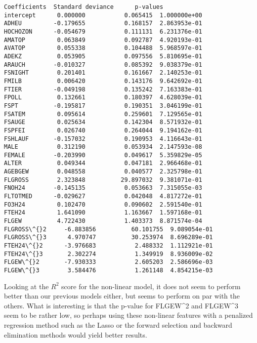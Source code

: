 \documentclass[11pt]{article}
\makeatletter
\newcommand{\boxspacing}{\kern\kvtcb@left@rule\kern\kvtcb@boxsep}
\newcommand{\prompt}[4]{
        \ttfamily\llap{{\color{#2}[#3]:\hspace{3pt}#4}}\vspace{-\baselineskip}
    }
\makeatother
\begin{document}
            \begin{tcolorbox}[breakable, size=fbox, boxrule=.5pt, pad at break*=1mm, opacityfill=0]
\prompt{Out}{outcolor}{31}{\boxspacing}
\begin{Verbatim}[commandchars=\\\{\}]
           Coefficients  Standard deviance      p-values
intercept      0.000000           0.065415  1.000000e+00
ADHEU         -0.179655           0.168157  2.863953e-01
HOCHOZON      -0.054679           0.111131  6.231376e-01
AMATOP         0.063849           0.092787  4.920193e-01
AVATOP         0.055338           0.104488  5.968597e-01
ADEKZ          0.053905           0.097556  5.810695e-01
ARAUCH        -0.010327           0.085392  9.038379e-01
FSNIGHT        0.201401           0.161667  2.140253e-01
FMILB          0.006420           0.143176  9.642692e-01
FTIER         -0.049198           0.135242  7.163383e-01
FPOLL          0.132661           0.180397  4.628039e-01
FSPT          -0.195817           0.190351  3.046199e-01
FSATEM         0.095614           0.259601  7.129565e-01
FSAUGE         0.025634           0.142304  8.571932e-01
FSPFEI         0.026740           0.264044  9.194162e-01
FSHLAUF       -0.157032           0.190953  4.116643e-01
MALE           0.312190           0.053934  2.147593e-08
FEMALE        -0.203990           0.049617  5.359829e-05
ALTER          0.049344           0.047181  2.966468e-01
AGEBGEW        0.048558           0.040577  2.325798e-01
FLGROSS        2.323848          29.897032  9.381071e-01
FNOH24        -0.145135           0.053663  7.315055e-03
FLTOTMED      -0.029627           0.042048  4.817272e-01
FO3H24         0.102470           0.090602  2.591540e-01
FTEH24         1.641090           1.163667  1.597168e-01
FLGEW          4.722430           1.403373  8.871574e-04
FLGROSS\^{}2     -6.883856          60.101755  9.089054e-01
FLGROSS\^{}3      4.970747          30.253974  8.696289e-01
FTEH24\^{}2      -3.976683           2.488332  1.112921e-01
FTEH24\^{}3       2.302274           1.349919  8.936009e-02
FLGEW\^{}2       -7.930333           2.605203  2.586696e-03
FLGEW\^{}3        3.584476           1.261148  4.854215e-03
\end{Verbatim}
\end{tcolorbox}
        
    Looking at the \(R^2\) score for the non-linear model, it does not seem
to perform better than our previous models either, but seems to perform
on par with the others. What is interesting is that the p-value for
FLGEW\^{}2 and FLGEW\^{}3 seem to be rather low, so perhaps using these
non-linear features with a penalized regression method such as the Lasso
or the forward selection and backward elimination methods would yield
better results.
\end{document}
